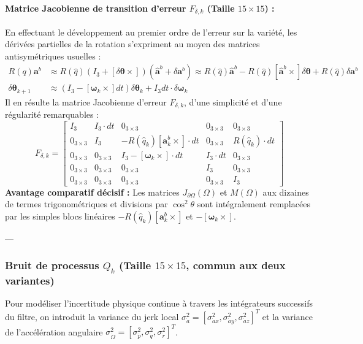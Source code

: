 \documentclass[../Formulations_Kalman.tex]{subfiles}
\begin{document}
\paragraph{Matrice Jacobienne de transition d'erreur $F_{\delta, k}$ (Taille $15 \times 15$) :}
En effectuant le développement au premier ordre de l'erreur sur la variété, les dérivées partielles de la rotation s'expriment au moyen des matrices antisymétriques usuelles :
\begin{align}
R(q) \mathbf{a}^b &\approx R(\hat{q}) (I_3 + [\delta\boldsymbol{\theta}\times]) (\hat{\mathbf{a}}^b + \delta\mathbf{a}^b) \approx R(\hat{q}) \hat{\mathbf{a}}^b - R(\hat{q}) [\hat{\mathbf{a}}^b \times] \delta\boldsymbol{\theta} + R(\hat{q}) \delta\mathbf{a}^b \\
\delta\boldsymbol{\theta}_{k+1} &\approx (I_3 - [\boldsymbol{\omega}_k \times] dt) \delta\boldsymbol{\theta}_k + I_3 dt \cdot \delta\boldsymbol{\omega}_k
\end{align}
Il en résulte la matrice Jacobienne d'erreur $F_{\delta, k}$, d'une simplicité et d'une régularité remarquables :
\begin{equation}
F_{\delta, k} = \begin{bmatrix}
I_3 & I_3 \cdot dt & 0_{3\times3} & 0_{3\times3} & 0_{3\times3} \\
0_{3\times3} & I_3 & -R(\hat{q}_k) [\mathbf{a}_k^b \times] \cdot dt & 0_{3\times3} & R(\hat{q}_k) \cdot dt \\
0_{3\times3} & 0_{3\times3} & I_3 - [\boldsymbol{\omega}_k \times] \cdot dt & I_3 \cdot dt & 0_{3\times3} \\
0_{3\times3} & 0_{3\times3} & 0_{3\times3} & I_3 & 0_{3\times3} \\
0_{3\times3} & 0_{3\times3} & 0_{3\times3} & 0_{3\times3} & I_3
\end{bmatrix}
\end{equation}
\textbf{Avantage comparatif décisif :} Les matrices $J_{\partial\Omega}(\Omega)$ et $M(\Omega)$ aux dizaines de termes trigonométriques et divisions par $\cos^2\theta$ sont intégralement remplacées par les simples blocs linéaires $-R(\hat{q}_k)[\mathbf{a}_k^b\times]$ et $-[\boldsymbol{\omega}_k\times]$.

---

\subsubsection{Bruit de processus $Q_k$ (Taille $15 \times 15$, commun aux deux variantes)}
Pour modéliser l'incertitude physique continue à travers les intégrateurs successifs du filtre, on introduit la variance du jerk local $\sigma_{\dot{a}}^2 = [\sigma_{\dot{a}x}^2, \sigma_{\dot{a}y}^2, \sigma_{\dot{a}z}^2]^T$ et la variance de l'accélération angulaire $\sigma_{\dot{\Omega}}^2 = [\sigma_{\dot{p}}^2, \sigma_{\dot{q}}^2, \sigma_{\dot{r}}^2]^T$.
\end{document}
